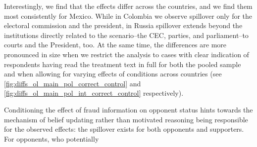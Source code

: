 \documentclass[11pt, ngerman,english,a4]{article}
\begin{document}

Interestingly, we find that the effects differ across the countries, and we find them most consistently for Mexico. While in Colombia we observe spillover only for the electoral commission and the president, in Russia spillover extends beyond the institutions directly related to the scenario--the CEC, parties, and parliament--to courts and the President, too. 
At the same time, the differences are more pronounced in size when we restrict the analysis to cases with clear indication of respondents having read the treatment text in full for both the pooled sample and when allowing for varying effects of conditions across countries (see \ref{fig:diffs_ol_main_pol_correct_control} and  \ref{fig:diffs_ol_main_pol_int_correct_control} respectively). 

Conditioning the effect of fraud information on opponent status hints towards the mechanism of belief updating rather than motivated reasoning being responsible for the observed effects: the spillover exists for both opponents and supporters. For opponents, who potentially   



\end{document}
